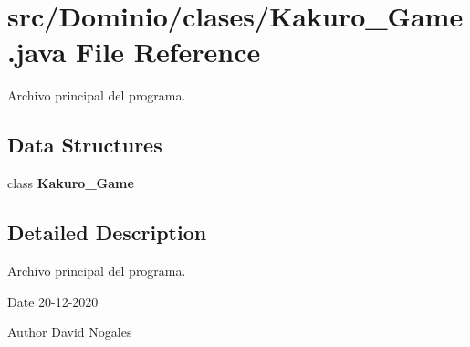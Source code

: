 \section{src/\+Dominio/clases/\+Kakuro\+\_\+\+Game.java File Reference}
\label{_kakuro___game_8java}


Archivo principal del programa.  


\subsection*{Data Structures}
\begin{DoxyCompactItemize}
\item 
class \textbf{ Kakuro\+\_\+\+Game}
\end{DoxyCompactItemize}


\subsection{Detailed Description}
Archivo principal del programa. 

\begin{DoxyDate}{Date}
20-\/12-\/2020 
\end{DoxyDate}
\begin{DoxyAuthor}{Author}
David Nogales 
\end{DoxyAuthor}
